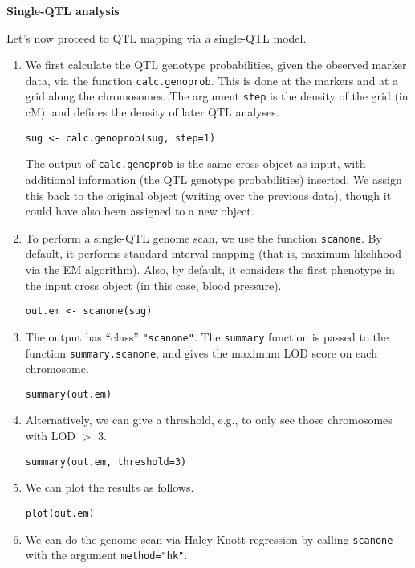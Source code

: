 \documentclass[10pt,letterpaper]{article}
\newcommand{\usercolor}{\color [named]{BlueViolet}}
\begin{document}
\vspace{12pt}
\textbf{Single-QTL analysis} \vspace{6pt}

Let's now proceed to QTL mapping via a single-QTL model.  

\begin{enumerate}
\addtocounter{enumi}{10}
\item We first calculate the QTL genotype probabilities, given the
observed marker data, via the function \verb-calc.genoprob-.  This is
done at the markers and at a grid along the chromosomes.  The argument
\verb-step- is the density of the grid (in cM), and defines the
density of later QTL analyses.

\usercolor
\verb|sug <- calc.genoprob(sug, step=1)|
\normalcolor

The output of \verb-calc.genoprob- is the same cross object as input,
with additional information (the QTL genotype probabilities) inserted.  We
assign this back to the original object (writing over the previous
data), though it could have also been assigned to a new object.

\item To perform a single-QTL genome scan, we use the function
  \verb-scanone-.  By default, it performs standard interval mapping
  (that is, maximum likelihood via the EM algorithm).  Also, by
  default, it considers the first phenotype in the input cross object
  (in this case, blood pressure).

\usercolor
\verb|out.em <- scanone(sug)|
\normalcolor

\item The output has ``class'' \verb-"scanone"-.  The \verb-summary-
  function is passed to the function \verb-summary.scanone-, and gives
  the maximum LOD score on each chromosome.

\usercolor
\verb|summary(out.em)|
\normalcolor

\item Alternatively, we can give a threshold, e.g., to only see those
  chromosomes with LOD $>$ 3.

\usercolor
\verb|summary(out.em, threshold=3)|
\normalcolor

\item We can plot the results as follows.

\usercolor
\verb|plot(out.em)|
\normalcolor

\item We can do the genome scan via Haley-Knott regression by calling
  \verb-scanone- with the argument \verb-method="hk"-.  


\end{enumerate}
\end{document}
